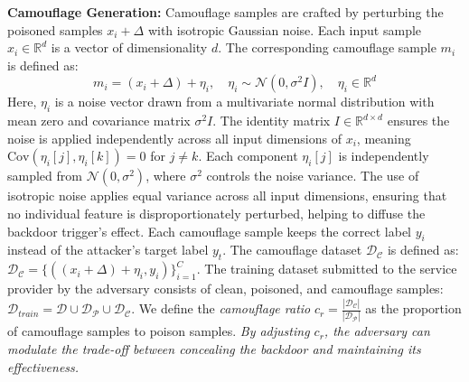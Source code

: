  \vspace{0.15cm}
\noindent \textbf{Camouflage Generation:} Camouflage samples are crafted by perturbing the poisoned samples $x_i + \Delta$ with isotropic Gaussian noise. Each input sample $x_i \in \mathbb{R}^d$ is a vector of dimensionality $d$. The corresponding camouflage sample $m_i$ is defined as:
\begin{equation*}
    m_i = (x_i + \Delta) + \eta_i, \quad \eta_i \sim \mathcal{N}(0, \sigma^2 I), \quad \eta_i \in \mathbb{R}^d
\end{equation*}
Here, $\eta_i$ is a noise vector drawn from a multivariate normal distribution with mean zero and covariance matrix $\sigma^2 I$. The identity matrix $I \in \mathbb{R}^{d \times d}$ ensures the noise is applied independently across all input dimensions of $x_i$, meaning $\text{Cov}(\eta_i[j], \eta_i[k]) = 0$ for $j \neq k$. Each component $\eta_i[j]$ is independently sampled from $\mathcal{N}(0, \sigma^2)$, where \(\sigma^2\) controls the noise variance. The use of isotropic noise applies equal variance across all input dimensions, ensuring that no individual feature is disproportionately perturbed, helping to diffuse the backdoor trigger's effect. Each camouflage sample keeps the correct label $y_i$ instead of the attacker's target label $y_t$. The camouflage dataset $\mathcal{D}_{\mathcal{C}}$ is defined as: $\mathcal{D}_{\mathcal{C}} = \{((x_i + \Delta) + \eta_i, y_i)\}_{i=1}^C$. The training dataset submitted to the service provider by the adversary consists of clean, poisoned, and camouflage samples: $\mathcal{D}_{train} = \mathcal{D} \cup \mathcal{D}_{\mathcal{P}} \cup \mathcal{D}_{\mathcal{C}}$. We define the \textit{camouflage ratio} $c_{r} = \frac{|\mathcal{D}_{\mathcal{C}}|}{|\mathcal{D}_{\mathcal{P}}|}$ as the proportion of camouflage samples to poison samples. \textit{By adjusting $c_{r}$, the adversary can modulate the trade-off between concealing the backdoor and maintaining its effectiveness.}